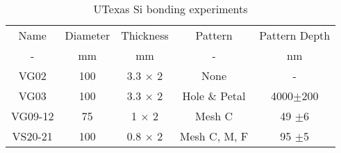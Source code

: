 \begin{table}[h!]
\caption{UTexas Si bonding experiments \label{tbl_experiments}}
\begin{center}
    \begin{tabular}{ c c c c c}
    \hline
    Name & Diameter & Thickness & Pattern & Pattern Depth\\ 
    -  & mm & mm & - & nm \\
        \hline
    VG02   & 100 & 3.3 $\times$ 2 &  None  & - \\
    VG03   & 100 & 3.3 $\times$ 2 &  Hole \& Petal & 4000$\pm$200 \\
    VG09-12   & 75   & 1 $\times$ 2 & Mesh C & 49 $\pm$6 \\
    VS20-21   & 100 & 0.8 $\times$ 2 &  Mesh C, M, F & 95 $\pm$5 \\
    \hline
    \end{tabular}
\end{center}
\end{table}